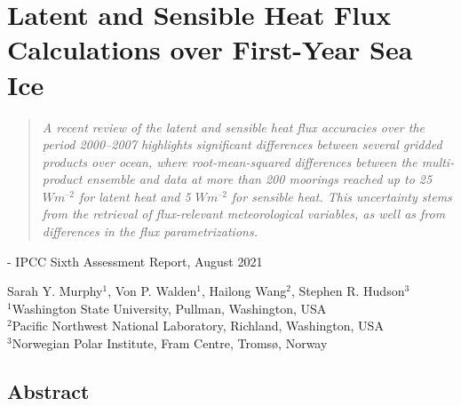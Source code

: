 \chapter{Latent and Sensible Heat Flux Calculations over First-Year Sea Ice}
\vspace{1 cm}
\begin{spacing}{1} \begin{quote} 
\noindent \emph{A recent review of the latent and sensible heat flux accuracies over the period 2000–2007 highlights significant differences between several gridded products over ocean, where root-mean-squared differences between the multi-product ensemble and data at more than 200  moorings reached up to 25 $W m^{–2}$ for latent heat and 5 $W m^{–2}$ for sensible heat. This uncertainty stems from the retrieval of flux-relevant meteorological variables, as well as from differences in the flux parametrizations.} \end{quote}
\hspace{6 cm} - IPCC Sixth Assessment Report, August 2021  
\end{spacing}
\vspace{1 cm}
\noindent Sarah Y. Murphy$^1$, Von P. Walden$^1$, Hailong Wang$^2$, Stephen R. Hudson$^3$
\vspace{1 cm}\\
\noindent $^1$Washington State University, Pullman, Washington, USA\\
$^2$Pacific Northwest National Laboratory, Richland, Washington, USA\\
$^3$Norwegian Polar Institute, Fram Centre, Tromsø, Norway\\

\section*{Abstract}

